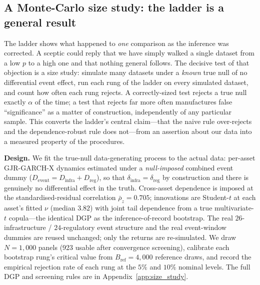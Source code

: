 \documentclass[pdflatex,sn-mathphys-num]{sn-jnl}
\theoremstyle{thmstyleone}
\theoremstyle{thmstyletwo}
\theoremstyle{thmstylethree}
\begin{document}
\subsection{A Monte-Carlo size study: the ladder is a general result}\label{sec:size_study}

The ladder shows what happened to \emph{one} comparison as the inference was corrected. A sceptic could reply that we have simply walked a single dataset from a low $p$ to a high one and that nothing general follows. The decisive test of that objection is a size study: simulate many datasets under a \emph{known} true null of no differential event effect, run each rung of the ladder on every simulated dataset, and count how often each rung rejects. A correctly-sized test rejects a true null exactly $\alpha$ of the time; a test that rejects far more often manufactures false ``significance'' as a matter of construction, independently of any particular sample. This converts the ladder's central claim---that the naive rule over-rejects and the dependence-robust rule does not---from an assertion about our data into a measured property of the procedures.

\textbf{Design.} We fit the true-null data-generating process to the actual data: per-asset GJR-GARCH-X dynamics estimated under a \emph{null-imposed} combined event dummy ($D_{\text{event}}=D_{\text{infra}}+D_{\text{reg}}$), so that $\delta_{\text{infra}}=\delta_{\text{reg}}$ by construction and there is genuinely no differential effect in the truth. Cross-asset dependence is imposed at the standardised-residual correlation $\bar\rho_z=0.705$; innovations are Student-$t$ at each asset's fitted $\nu$ (median $3.82$) with joint tail dependence from a true multivariate-$t$ copula---the identical DGP as the inference-of-record bootstrap. The real $26$-infrastructure / $24$-regulatory event structure and the real event-window dummies are reused unchanged; only the returns are re-simulated. We draw $N=1{,}000$ panels (923 usable after convergence screening), calibrate each bootstrap rung's critical value from $B_{\text{ref}}=4{,}000$ reference draws, and record the empirical rejection rate of each rung at the $5\%$ and $10\%$ nominal levels. The full DGP and screening rules are in Appendix~\ref{app:size_study}.
\end{document}

